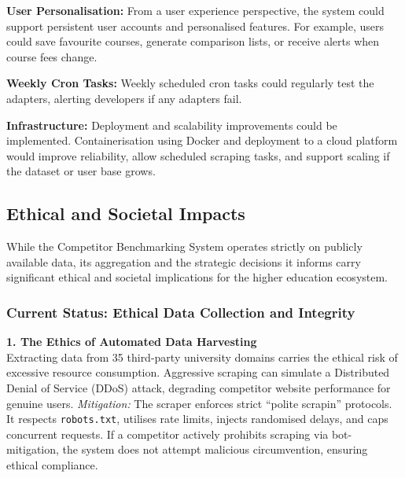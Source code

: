 
\textbf{User Personalisation:} From a user experience perspective, the system could support persistent user accounts and personalised features. For example, users could save favourite courses, generate comparison lists, or receive alerts when course fees change.

\textbf{Weekly Cron Tasks:} Weekly scheduled cron tasks could regularly test the adapters, alerting developers if any adapters fail.

\textbf{Infrastructure:} Deployment and scalability improvements could be implemented. Containerisation using Docker and deployment to a cloud platform would improve reliability, allow scheduled scraping tasks, and support scaling if the dataset or user base grows.

\subsection{Ethical and Societal Impacts}

While the Competitor Benchmarking System operates strictly on publicly available data, its aggregation and the strategic decisions it informs carry significant ethical and societal implications for the higher education ecosystem. 

\subsubsection{Current Status: Ethical Data Collection and Integrity}

\textbf{1. The Ethics of Automated Data Harvesting} \\
Extracting data from 35 third-party university domains carries the ethical risk of excessive resource consumption. Aggressive scraping can simulate a Distributed Denial of Service (DDoS) attack, degrading competitor website performance for genuine users. 
\textit{Mitigation:} The scraper enforces strict ``polite scrapin'' protocols. It respects \texttt{robots.txt}, utilises rate limits, injects randomised delays, and caps concurrent requests. If a competitor actively prohibits scraping via bot-mitigation, the system does not attempt malicious circumvention, ensuring ethical compliance.

